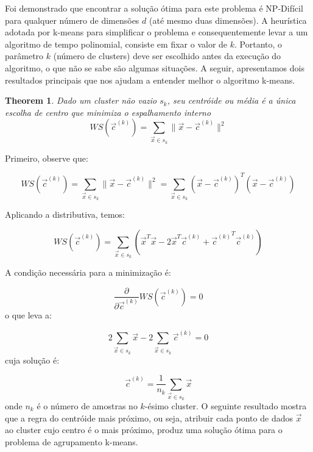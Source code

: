 \documentclass[sn-mathphys,Numbered]{sn-jnl}%
\theoremstyle{thmstyleone}%
\newtheorem{theorem}{Theorem}%
\theoremstyle{thmstyletwo}%
\theoremstyle{thmstylethree}%
\begin{document}
Foi demonstrado que encontrar a solução ótima para este problema é NP-Difícil para qualquer número de dimensões $d$ (até mesmo duas dimensões). A heurística adotada por k-means para simplificar o problema e consequentemente levar a um algoritmo de tempo polinomial, consiste em fixar o valor de $k$. Portanto, o parâmetro $k$ (número de clusters) deve ser escolhido antes da execução do algoritmo, o que não se sabe são algumas situações. A seguir, apresentamos dois resultados principais que nos ajudam a entender melhor o algoritmo k-means.

\vspace{0.5cm}
\begin{theorem}
    Dado um cluster não vazio $s_k$, seu centróide ou média é a única escolha de centro que minimiza o espalhamento interno
	\begin{equation}
		WS(\vec{c}^{(k)}) = \sum_{\vec{x} \in s_k} \lVert \vec{x} - \vec{c}^{(k)}  \rVert^2
	\end{equation}
\end{theorem}

Primeiro, observe que:

\begin{equation}
	WS(\vec{c}^{(k)}) = \sum_{\vec{x} \in s_k} \lVert \vec{x} - \vec{c}^{(k)}  \rVert^2 = \sum_{\vec{x} \in s_k} ( \vec{x} - \vec{c}^{(k)} )^T ( \vec{x} - \vec{c}^{(k)} )
\end{equation}

Aplicando a distributiva, temos:

\begin{equation}
	WS(\vec{c}^{(k)}) = \sum_{\vec{x} \in s_k} \left( \vec{x}^T \vec{x} - 2 \vec{x}^T \vec{c}^{(k)} + {\vec{c}^{(k)}}^{T} \vec{c}^{(k)}  \right)
\end{equation}

A condição necessária para a minimização é:

\begin{equation}
	\frac{\partial}{\partial \vec{c}^{(k)}} WS(\vec{c}^{(k)}) = 0
\end{equation} 
o que leva a:

\begin{equation}
	2 \sum_{\vec{x} \in s_k} \vec{x} - 2 \sum_{\vec{x} \in s_k} \vec{c}^{(k)} = 0
\end{equation} 
cuja solução é:

\begin{equation}
	\vec{c}^{(k)} = \frac{1}{n_k} \sum_{\vec{x} \in s_k} \vec{x}
\end{equation} 
onde $n_k$ é o número de amostras no $k$-ésimo cluster. O seguinte resultado mostra que a regra do centróide mais próximo, ou seja, atribuir cada ponto de dados $\vec{x}$ ao cluster cujo centro é o mais próximo, produz uma solução ótima para o problema de agrupamento k-means. 
\end{document}
